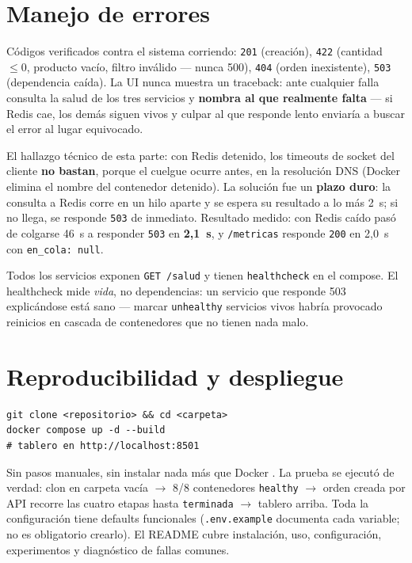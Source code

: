 \documentclass[12pt,a4paper]{article}
\begin{document}
\section{Manejo de errores}

Códigos verificados contra el sistema corriendo: \texttt{201} (creación),
\texttt{422} (cantidad $\leq 0$, producto vacío, filtro inválido — nunca 500),
\texttt{404} (orden inexistente), \texttt{503} (dependencia caída). La UI nunca muestra un traceback: ante cualquier falla consulta
la salud de los tres servicios y \textbf{nombra al que realmente falta} — si
Redis cae, los demás siguen vivos y culpar al que responde lento enviaría a
buscar el error al lugar equivocado.

El hallazgo técnico de esta parte: con Redis detenido, los timeouts de socket
del cliente \textbf{no bastan}, porque el cuelgue ocurre antes, en la
resolución DNS (Docker elimina el nombre del contenedor detenido). La solución fue un
\textbf{plazo duro}: la consulta a Redis corre en un hilo aparte y se espera su
resultado a lo más 2~s; si no llega, se responde \texttt{503} de inmediato.
Resultado medido: con Redis caído pasó de colgarse 46~s
a responder \texttt{503} en \textbf{2{,}1~s}, y \texttt{/metricas} responde
\texttt{200} en 2{,}0~s con \texttt{en\_cola: null}.

Todos los servicios exponen \texttt{GET /salud} y tienen \texttt{healthcheck}
en el compose. El healthcheck mide \emph{vida}, no dependencias: un servicio
que responde 503 explicándose está sano — marcar \texttt{unhealthy} servicios
vivos habría provocado reinicios en cascada de contenedores que no tienen nada
malo.

\section{Reproducibilidad y despliegue}

\begin{lstlisting}
git clone <repositorio> && cd <carpeta>
docker compose up -d --build
# tablero en http://localhost:8501
\end{lstlisting}

Sin pasos manuales, sin instalar nada más que Docker \cite{docker}. La prueba se ejecutó
de verdad: clon en carpeta vacía $\to$ 8/8 contenedores \texttt{healthy} $\to$
orden creada por API recorre las cuatro etapas hasta \texttt{terminada} $\to$
tablero arriba. Toda la configuración tiene defaults funcionales
(\texttt{.env.example} documenta cada variable; no es obligatorio crearlo).
El README cubre instalación, uso, configuración, experimentos y diagnóstico de
fallas comunes.
\end{document}
